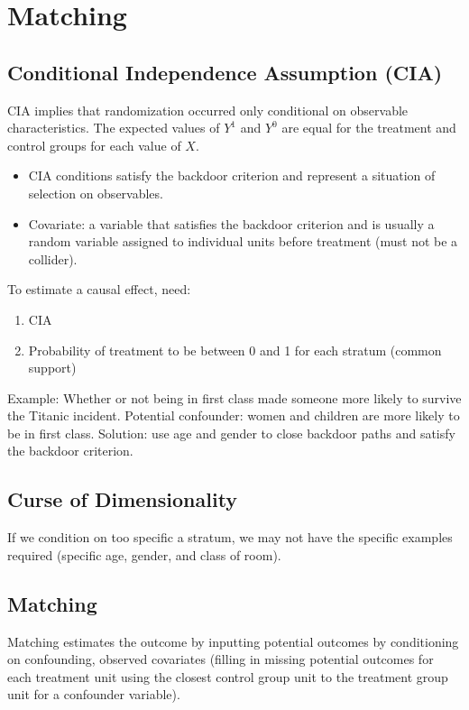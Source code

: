 \documentclass{article}
\begin{document}
\section*{Matching}
\subsection*{Conditional Independence Assumption (CIA)}
CIA implies that randomization occurred only conditional on observable characteristics. The expected values of \(Y^1\) and \(Y^0\) are equal for the treatment and control groups for each value of \(X\).

\begin{itemize}
    \item CIA conditions satisfy the backdoor criterion and represent a situation of selection on observables.
    \item Covariate: a variable that satisfies the backdoor criterion and is usually a random variable assigned to individual units before treatment (must not be a collider).
\end{itemize}

To estimate a causal effect, need:
\begin{enumerate}
    \item CIA
    \item Probability of treatment to be between 0 and 1 for each stratum (common support)
\end{enumerate}

Example: Whether or not being in first class made someone more likely to survive the Titanic incident. Potential confounder: women and children are more likely to be in first class. Solution: use age and gender to close backdoor paths and satisfy the backdoor criterion.

\subsection*{Curse of Dimensionality}
If we condition on too specific a stratum, we may not have the specific examples required (specific age, gender, and class of room).

\subsection*{Matching}
Matching estimates the outcome by inputting potential outcomes by conditioning on confounding, observed covariates (filling in missing potential outcomes for each treatment unit using the closest control group unit to the treatment group unit for a confounder variable).
\end{document}
